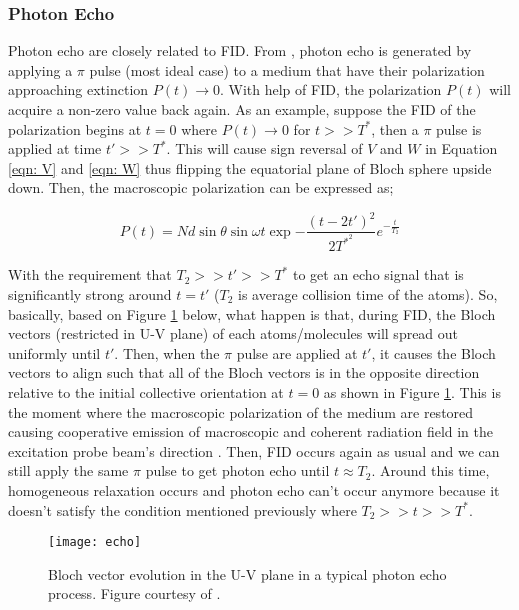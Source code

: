 \subsubsection{Photon Echo}
Photon echo are closely related to FID. From \cite{Meystre2006}, photon echo is generated by applying a $\pi$ pulse (most ideal case) to a medium that have their polarization approaching extinction $P(t) \longrightarrow 0$. With help of FID, the polarization $P(t)$ will acquire a non-zero value back again. As an example, suppose the FID of the polarization begins at $t = 0$ where $P(t) \longrightarrow 0$ for $t >> T^{*}$, then a $\pi$ pulse is applied at time $t' >> T^{*}$. This will cause sign reversal of $V$ and $W$ in Equation \ref{eqn: V} and \ref{eqn: W} thus flipping the equatorial plane of Bloch sphere upside down. Then, the macroscopic polarization can be expressed as;

\begin{equation}
    P(t) = N d \sin{\theta} \sin{\omega t} \exp{- \frac{(t - 2t')^{2}}{2 T^{*^{2}}}} e^{-\frac{t}{T_{2}}}
\end{equation}

With the requirement that $T_{2} >> t' >> T^{*}$ to get an echo signal that is significantly strong around $t = t'$ ($T_{2}$ is average collision time of the atoms).  So, basically, based on Figure \ref{fig: echo} below, what happen is that, during FID, the Bloch vectors (restricted in U-V plane) of each atoms/molecules will spread out uniformly until $t'$. Then, when the $\pi$ pulse are applied at $t'$, it causes the Bloch vectors to align such that all of the Bloch vectors is in the opposite direction relative to the initial collective orientation at $t = 0$ as shown in Figure \ref{fig: echo}. This is the moment where the macroscopic polarization of the medium are restored causing cooperative emission of macroscopic and coherent radiation field in the excitation probe beam's direction \cite{Meschede2017}. Then, FID occurs again as usual and we can still apply the same $\pi$ pulse to get photon echo until $t \approx T_{2}$. Around this time, homogeneous relaxation occurs and photon echo can't occur anymore because it doesn't satisfy the condition mentioned previously where $T_{2} >> t >> T^{*}$.

\begin{figure}[h!]
    \centering
    \texttt{[image: echo]}
    \caption{Bloch vector evolution in the U-V plane in a typical photon echo process. Figure courtesy of \cite{Meystre2006}.}
    \label{fig: echo}
\end{figure}

